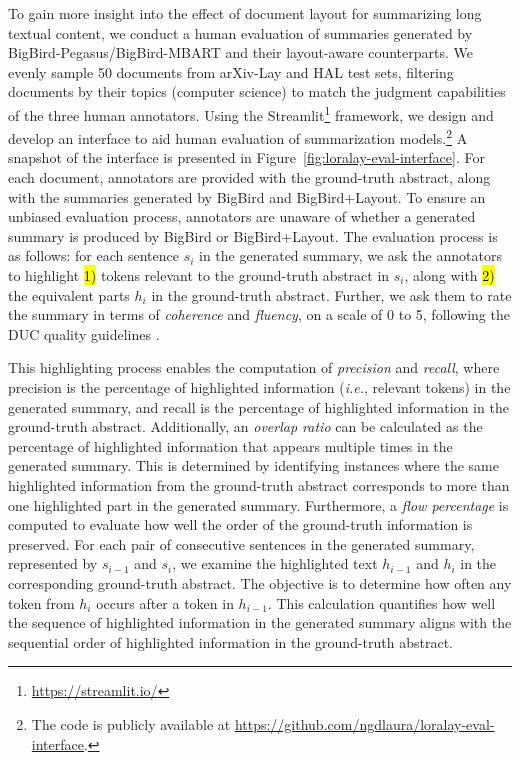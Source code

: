 To gain more insight into the effect of document layout for summarizing long textual content, we conduct a human evaluation of summaries generated by BigBird-Pegasus/BigBird-MBART and their layout-aware counterparts. We evenly sample 50 documents from arXiv-Lay and HAL test sets, filtering documents by their topics (computer science) to match the judgment capabilities of the three human annotators. 
Using the Streamlit\footnote{\url{https://streamlit.io/}} framework, we design and develop an interface to aid human evaluation of summarization models.\footnote{The code is publicly available at \url{https://github.com/ngdlaura/loralay-eval-interface}.} A snapshot of the interface is presented in Figure~\ref{fig:loralay-eval-interface}. For each document, annotators are provided with the ground-truth abstract, along with the summaries generated by BigBird and BigBird+Layout. To ensure an unbiased evaluation process, annotators are unaware of whether a generated summary is produced by BigBird or BigBird+Layout. The evaluation process is as follows: for each sentence $s_i$ in the generated summary, we ask the annotators to highlight \hl{1)} tokens relevant to the ground-truth abstract in $s_i$, along with \hl{2)} the equivalent parts $h_i$ in the ground-truth abstract. Further, we ask them to rate the summary in terms of \textit{coherence} and \textit{fluency}, on a scale of 0 to 5, following the DUC quality guidelines \citep{dang2005overview}. 

This highlighting process enables the computation of \textit{precision} and \textit{recall}, where precision is the percentage of highlighted information (\textit{i.e.}, relevant tokens) in the generated summary, and recall is the percentage of highlighted information in the ground-truth abstract. Additionally, an \textit{overlap ratio} can be calculated as the percentage of highlighted information that appears multiple times in the generated summary. This is determined by identifying instances where the same highlighted information from the ground-truth abstract corresponds to more than one highlighted part in the generated summary. Furthermore, a \textit{flow percentage} is computed to evaluate how well the order of the ground-truth information is preserved. For each pair of consecutive sentences in the generated summary, represented by $s_{i-1}$ and $s_i$, we examine the highlighted text $h_{i-1}$ and $h_i$ in the corresponding ground-truth abstract. The objective is to determine how often any token from $h_i$ occurs after a token in $h_{i-1}$. This calculation quantifies how well the sequence of highlighted information in the generated summary aligns with the sequential order of highlighted information in the ground-truth abstract.

